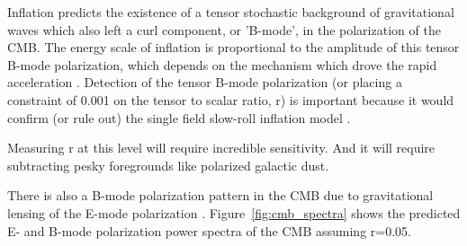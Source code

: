 Inflation predicts the existence of a tensor stochastic background of gravitational waves which also left a curl component, or 'B-mode', in the polarization of the \ac{CMB}.  
The energy scale of inflation is proportional to the amplitude of this tensor B-mode polarization, which depends on the mechanism which drove the rapid acceleration \cite{Grishchuk1975} \cite{starobinsky1982} \cite{Rubakov1982} \cite{starobinskii1983} \cite{Abbott1984}.
Detection of the tensor B-mode polarization (or placing a constraint of 0.001 on the tensor to scalar ratio, r) is important because it would confirm (or rule out) the single field slow-roll inflation model \cite{Abazajian2015}.

Measuring r at this level will require incredible sensitivity. 
And it will require subtracting pesky foregrounds like polarized galactic dust. 


There is also a B-mode polarization pattern in the \ac{CMB} due to gravitational lensing of the E-mode polarization \cite{polarbear2014} \cite{naess2014} \cite{keisler2015}.
Figure~\ref{fig:cmb_spectra} shows the predicted E- and B-mode polarization power spectra of the \ac{CMB} assuming r=0.05.


%



